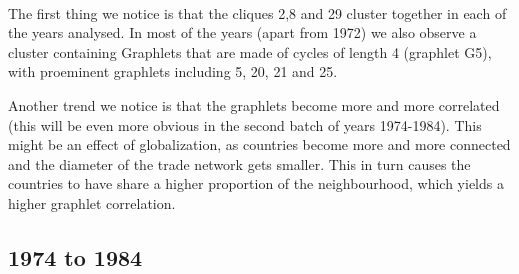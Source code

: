 \documentclass[11pt,a4paper,oneside]{report}
\begin{document}
\begin{figure}[H]
  \\

\end{figure}

The first thing we notice is that the cliques 2,8 and 29 cluster together in each 
of the years analysed. In most of the years (apart from 1972) we also observe a 
cluster containing Graphlets that are made of cycles of length 4 (graphlet G5), 
with proeminent graphlets including 5, 20, 21 and 25. 

Another trend we notice is that the graphlets become more and more correlated 
(this will be even more obvious in the second batch of years 1974-1984). This 
might be an effect of globalization, as countries become more and more connected 
and the diameter of the trade network gets smaller. This in turn causes the 
countries to have share a higher proportion of the neighbourhood, which yields 
a higher graphlet correlation.




\subsection*{1974 to 1984}
\end{document}
